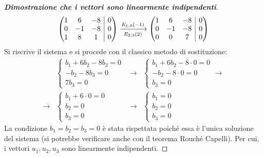 \documentclass[a4paper]{article}
\makeatletter
\newenvironment{rowequmat}[1]{\left(\array{@{}#1@{}}}{\endarray\right)}
\makeatother
\begin{document}
\begin{proof}[\textbf{Dimostrazione che i vettori sono linearmente indipendenti}]
\begin{equation*}
\begin{rowequmat}{ccc|c}
				1 &  6 & -8 & 0 \\
				0 & -1 & -8 & 0 \\
				1 &  8 &  1 & 0
			\end{rowequmat} \xlongrightarrow[E_{2,3}\left(2\right)]{E_{1,3}\left(-1\right)}
			\begin{rowequmat}{ccc|c}
				1 &  6 & -8 & 0 \\
				0 & -1 & -8 & 0 \\
				0 &  0 &  7 & 0
			\end{rowequmat}
		\end{equation*}
		Si riscrive il sistema e si procede con il classico metodo di sostituzione:
		\begin{equation*}
			\begin{array}{lllll}
				&\begin{cases}
					b_{1} + 6b_{2} - 8b_{3} = 0 \\
					-b_{2} - 8b_{3} = 0 \\
					7b_{3} = 0
				\end{cases} &\rightarrow&
				\begin{cases}
					b_{1} + 6b_{2} - 8 \cdot 0 = 0 \\
					-b_{2} - 8 \cdot 0 = 0 \\
					b_{3} = 0
				\end{cases} \rightarrow \\ [1.8em]
				\rightarrow & \begin{cases}
					b_{1} + 6 \cdot 0 = 0 \\
					b_{2} = 0 \\
					b_{3} = 0
				\end{cases} &\rightarrow&
				\begin{cases}
					b_{1} = 0 \\
					b_{2} = 0 \\
					b_{3} = 0
				\end{cases}
			\end{array}
		\end{equation*}
		La condizione $b_{1} = b_{2} = b_{3} = 0$ è stata rispettata poiché essa è l'unica soluzione del sistema (si potrebbe verificare anche con il teorema Rouché Capelli). Per cui, i vettori $u_{1}, u_{2}, u_{3}$ sono linearmente indipendenti.
	\end{proof}\newpage
	
\end{document}
